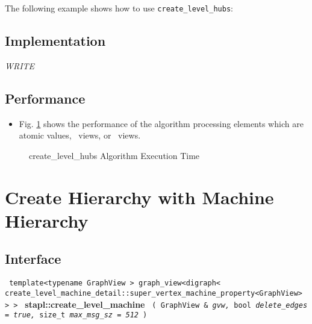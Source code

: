 The following example shows how to use 
\texttt{create\_level\_hubs}:


\subsection{Implementation} \label{sec-create-level-hubs-alg-impl}

\textit{WRITE}

\subsection{Performance} \label{sec-create-level-hubs-alg-perf}

\begin{itemize}
\item
Fig. \ref{fig:cr-level-hubs-alg-exec-exper}
shows the performance of the algorithm processing
elements which are atomic values, \stl\ views, or \stapl\ views.
\end{itemize}

\begin{figure}[p]
\caption{ create\_level\_hubs Algorithm Execution Time}
\label{fig:cr-level-hubs-alg-exec-exper}
\end{figure}


\section{ Create Hierarchy with Machine Hierarchy}
\label{sec-create-level-mach-alg}

\subsection{Interface} \label{sec-create-level-mach-alg-inter}

\noindent
\texttt{%
template<typename GraphView >
\newline
graph\_view<digraph< create\_level\_machine\_detail::super\_vertex\_machine\_property<GraphView> > > 
}
\newline
\textbf{stapl::create\_level\_machine}%
\newline
\texttt{%
(
GraphView \&
\textit{gvw,}%
bool
\textit{delete\_edges = true,}%
size\_t
\textit{max\_msg\_sz = 512}%
)     
}
\vspace{0.4cm}

